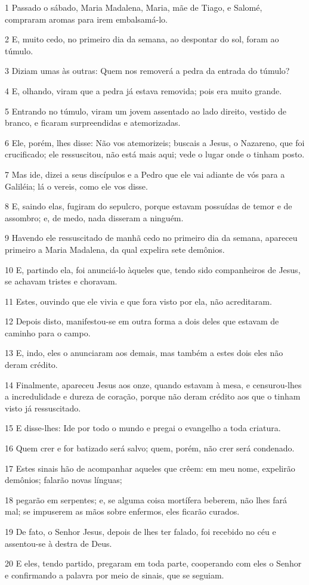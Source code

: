 \par 1 Passado o sábado, Maria Madalena, Maria, mãe de Tiago, e Salomé, compraram aromas para irem embalsamá-lo.
\par 2 E, muito cedo, no primeiro dia da semana, ao despontar do sol, foram ao túmulo.
\par 3 Diziam umas às outras: Quem nos removerá a pedra da entrada do túmulo?
\par 4 E, olhando, viram que a pedra já estava removida; pois era muito grande.
\par 5 Entrando no túmulo, viram um jovem assentado ao lado direito, vestido de branco, e ficaram surpreendidas e atemorizadas.
\par 6 Ele, porém, lhes disse: Não vos atemorizeis; buscais a Jesus, o Nazareno, que foi crucificado; ele ressuscitou, não está mais aqui; vede o lugar onde o tinham posto.
\par 7 Mas ide, dizei a seus discípulos e a Pedro que ele vai adiante de vós para a Galiléia; lá o vereis, como ele vos disse.
\par 8 E, saindo elas, fugiram do sepulcro, porque estavam possuídas de temor e de assombro; e, de medo, nada disseram a ninguém.
\par 9 Havendo ele ressuscitado de manhã cedo no primeiro dia da semana, apareceu primeiro a Maria Madalena, da qual expelira sete demônios.
\par 10 E, partindo ela, foi anunciá-lo àqueles que, tendo sido companheiros de Jesus, se achavam tristes e choravam.
\par 11 Estes, ouvindo que ele vivia e que fora visto por ela, não acreditaram.
\par 12 Depois disto, manifestou-se em outra forma a dois deles que estavam de caminho para o campo.
\par 13 E, indo, eles o anunciaram aos demais, mas também a estes dois eles não deram crédito.
\par 14 Finalmente, apareceu Jesus aos onze, quando estavam à mesa, e censurou-lhes a incredulidade e dureza de coração, porque não deram crédito aos que o tinham visto já ressuscitado.
\par 15 E disse-lhes: Ide por todo o mundo e pregai o evangelho a toda criatura.
\par 16 Quem crer e for batizado será salvo; quem, porém, não crer será condenado.
\par 17 Estes sinais hão de acompanhar aqueles que crêem: em meu nome, expelirão demônios; falarão novas línguas;
\par 18 pegarão em serpentes; e, se alguma coisa mortífera beberem, não lhes fará mal; se impuserem as mãos sobre enfermos, eles ficarão curados.
\par 19 De fato, o Senhor Jesus, depois de lhes ter falado, foi recebido no céu e assentou-se à destra de Deus.
\par 20 E eles, tendo partido, pregaram em toda parte, cooperando com eles o Senhor e confirmando a palavra por meio de sinais, que se seguiam.


